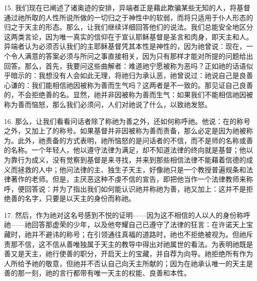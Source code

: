 15. 我们现在已阐述了诸奥迹的安排，异端者正是藉此欺骗某些无知的人，将基督通过祂所取的人性所说所做的一切归之于神性中的软弱，而将只适用于仆人形态的归之于天主的形态。那么，让我们继续详细回答他们的说法。我们总能安全地区分这两类言论，因为唯一真实的信仰在于宣认耶稣基督是圣言和肉身，即天主和人。异端者认为必须否认我们的主耶稣基督凭其本性是神性的，因为祂曾说：现在，一个令人满意的答案必须与所问之事直接相关，因为只有那样才能对所提的问题给出回答。那么，首先，我要问这些曲解者：难道祂宁愿被称为恶吗？正如祂的话语似乎暗示的：我想没有人会如此无理，将祂归为承认恶，祂曾说过：祂说自己是良善心谦的：我们能相信祂因被称为善而生气吗？这两者是不一致的。那见证自己良善的，不会拒绝善的名。显然，祂并非因被称为善而生气：如果我们不能相信祂因被称为善而恼怒，那么我们必须问，人们对祂说了什么，以致祂发怒。\par

16. 那么，让我们看看问话者除了称祂为善之外，还如何称呼祂。他说：在的称号之外，又加上了的称号。如果基督并非因被称为善而责备，那么必定是因为祂被称为。此外，祂责备的方式表明，祂所恼怒的是问话者的不信，而不是师的名称或善的名称。一个年轻人，他以遵守法律为满足，却不知道法律的终向就是基督；他以为靠行为成义，没有觉察到基督是来寻找，并来到那些相信法律不能藉着信德的成义而拯救的人中；他问法律的主、独生子天主，好像祂只是一个教授普遍规条和法律著作的老师。但是，主厌恶这种不虔不信的宣告，即把他当作一个法律教师来称呼，便回答说：并为了指出我们如何能认识祂并称祂为善，祂又加上：这并不是拒绝善的名字，只要是以天主的身份而称祂。\par

17. 然后，作为祂对这名号感到不悦的证明——因为这不相信的人以人的身份称呼祂——祂回答那虚荣的少年，以及他夸耀自己已遵守了法律的狂言：在许诺天上宝藏时，祂并不避讳的称号；在引领通往真福的道路时，祂也不拒绝被视为。但祂斥责那不信，这不信从善唯独属于天主的教导中得出对祂属世的看法。为表明祂既是善又是天主，祂行使善的职分，开启天上的宝藏，并自荐为向导。祂拒绝所有作为人所给予祂的敬意，但祂并不否认自己向天主所献的；因为在祂承认唯一的天主是善的那一刻，祂的言行都带有唯一天主的权能、良善和本性。\par

